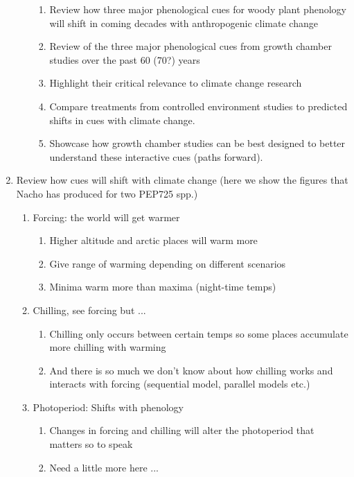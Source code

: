 \documentclass[11pt,letterpaper]{article}
\begin{document}
\begin{enumerate}
\begin{enumerate}
\begin{enumerate}
\item Review how three major phenological cues for woody plant phenology will shift in coming decades with anthropogenic climate change
\item Review of the three major phenological cues from growth chamber studies over the past 60 (70?) years
\item Highlight their critical relevance to climate change research 
\item Compare treatments from controlled environment studies to predicted shifts in cues with climate change.  
\item Showcase how growth chamber studies can be best designed to better understand these interactive cues (paths forward). 
\end{enumerate}
\end{enumerate}
\item Review how cues will shift with climate change (here we show the figures that Nacho has produced for two PEP725 spp.)
\begin{enumerate}
\item Forcing: the world will get warmer %
\begin{enumerate}
\item Higher altitude and arctic places will warm more
\item Give range of warming depending on different scenarios
\item Minima warm more than maxima (night-time temps)
\end{enumerate}
\item Chilling, see forcing but ... 
\begin{enumerate}
\item Chilling only occurs between certain temps so some places accumulate more chilling with warming
\item And there is so much we don't know about how chilling works and interacts with forcing (sequential model, parallel models etc.)
\end{enumerate}
\item Photoperiod: Shifts with phenology
\begin{enumerate}
\item Changes in forcing and chilling will alter the photoperiod that matters so to speak
\item Need a little more here ... 

\end{enumerate}
\end{enumerate}
\end{enumerate}
\end{document}
